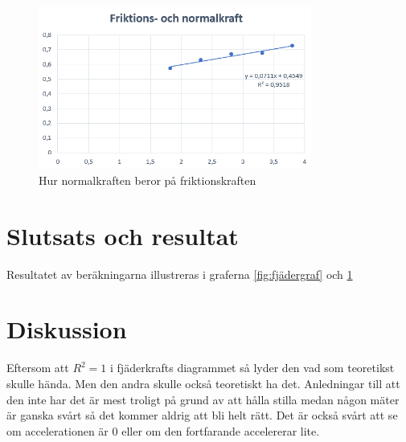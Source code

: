 \documentclass[11p, titlepage, oneside, a4paper]{article}
\begin{document}
    \begin{figure}[!h]
        \includegraphics[width=0.8\textwidth]{Friktionsgraf}
        \caption{Hur normalkraften beror på friktionskraften}
        \label{fig:friktionsgraf}
    \end{figure}

    \section{Slutsats och resultat} 
        Resultatet av beräkningarna illustreras i graferna \ref{fig:fjädergraf} och \ref{fig:friktionsgraf}
    \section{Diskussion} 
    Eftersom att \(R^{2} = 1\) i fjäderkrafts diagrammet så lyder den vad som teoretikst skulle hända. Men den andra skulle också teoretiskt ha det. Anledningar till att den inte har det är mest troligt på grund av att hålla stilla medan någon mäter är ganska svårt så det kommer aldrig att bli helt rätt. Det är också svårt att se om accelerationen är 0 eller om den fortfarande accelererar lite.

    
    \printbibliography
\end{document}
